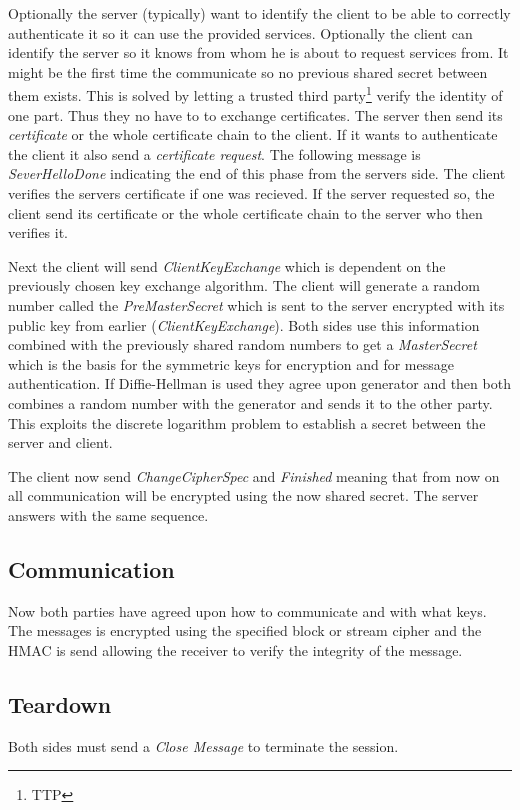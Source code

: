 \documentclass[10pt, a4paper]{article}
\begin{document}
Optionally the server (typically) want to identify the client to be able to correctly authenticate it so it can use the provided services. Optionally the client can identify the server so it knows from whom he is about to request services from. It might be the first time the communicate so no previous shared secret between them exists. This is solved by letting a trusted third party\footnote{TTP} verify the identity of one part. Thus they no have to to exchange certificates. The server then send its \emph{certificate} or the whole certificate chain to the client. If it wants to authenticate the client it also send a \emph{certificate request}. The following message is \emph{SeverHelloDone} indicating the end of this phase from the servers side.  The client verifies the servers certificate if one was recieved. If the server requested so, the client send its certificate or the whole certificate chain to the server who then verifies it.

Next the client will send \emph{ClientKeyExchange} which is dependent on the previously chosen key exchange algorithm. The client will generate a random number called the \emph{PreMasterSecret} which is sent to the server encrypted with its public key from earlier (\emph{ClientKeyExchange}). Both sides use this information combined with the previously shared random numbers to get a \emph{MasterSecret} which is the basis for the symmetric keys for encryption and for message authentication. If Diffie-Hellman is used they agree upon generator and then both combines a random number with the generator and sends it to the other party. This exploits the discrete logarithm problem to establish a secret between the server and client. %

The client now send \emph{ChangeCipherSpec} and \emph{Finished} meaning that from now on all communication will be encrypted using the now shared secret. The server answers with the same sequence.

\subsection{Communication}
Now both parties have agreed upon how to communicate and with what keys. The messages is encrypted using the specified block or stream cipher and the HMAC is send allowing the receiver to verify the integrity of the message.

\subsection{Teardown}
Both sides must send a \emph{Close Message} to terminate the session.
\end{document}
